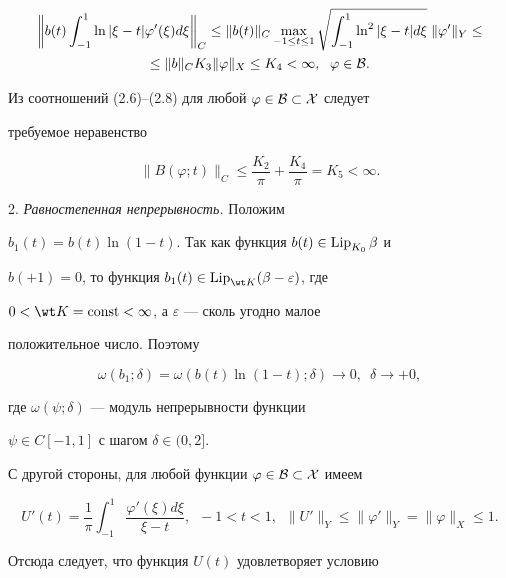 \begin{pf}
\begin{multline}


\bigg\| b(t)\int_{-1}^1\ln|\xi-t|\varphi'(\xi)d\xi\bigg \|_C


\leq\| b(t)\|_C\max_{-1\leq t\leq 1}\sqrt{\int_{-1}^1\ln^2|


\xi-t| d\xi}\; \|\varphi'\|_Y\leq \\


%


\leq\| b\|_CK_3\|\varphi\|_X\leq K_4<\infty,\ \; \varphi\in \cal B.


\end{multline}


Из соотношений (2.6)--(2.8) для любой $\varphi\in \cal B\subset X$ следует 


требуемое неравенство


$$


\| B(\varphi;t)\|_C\leq\frac{K_2}{\pi}+\frac{K_4}{\pi}=K_5<\infty.


$$





2. {\it Равностепенная непрерывность.} Положим 


$b_1 (t)=b(t)\ln(1-t)$. Так как функция $b(t)\in \operatorname{Lip}_{K_0}\beta$ и


$b(+1)=0$, то функция $b_1 (t)\in \Lip_{\wt K}(\beta-\varepsilon)$, где


$0<\wt K=\const<\infty$, а $\varepsilon$ --- сколь угодно малое 


положительное число. Поэтому


\begin{equation}


\omega(b_1;\delta)=\omega(b(t)\ln(1-t);\delta)\to 0,\ \; \delta\to +0,


\end{equation}


где $\omega(\psi;\delta)$ --- модуль непрерывности функции 


$\psi\in C[-1,1]$ с шагом $\delta\in(0,2]$.


С другой стороны, для любой функции $\varphi\in \cal B\subset X$ имеем


$$


U'(t)=\frac{1}{\pi}\int_{-1}^1\frac{\varphi'(\xi)d\xi}{\xi-t},\ \;-1<t<1,\ \;


\| U'\|_Y\leq\|\varphi'\|_Y=\|\varphi\|_X\leq 1.


$$


Отсюда следует, что функция $U(t)$ удовлетворяет условию



\end{pf}
